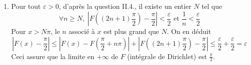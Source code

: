 \begin{enumerate}
\begin{enumerate}
\item Pour tout $\varepsilon >0$, d'après la question II.4., il existe un entier $N$ tel que 
\begin{displaymath}
  \forall n \geq N,\; \left|F((2n+1)\frac{\pi}{2}) - \frac{\pi}{2}\right| < \frac{\varepsilon}{2} \text{ et } \frac{1}{n} < \frac{\varepsilon}{2}
\end{displaymath}
Pour $x> N\pi$, le $n$ associé à $x$ est plus grand que $N$. On en déduit
\begin{displaymath}
\left|F(x) - \frac{\pi}{2}\right| \leq  \left|F(x) - F(\frac{\pi}{2} + n\pi) \right| + \left|F((2n+1)\frac{\pi}{2}) - \frac{\pi}{2}\right|
\leq \frac{\varepsilon}{2} + \frac{\varepsilon}{2} = \varepsilon
\end{displaymath}
Ceci assure que la limite en $+\infty$ de $F$ (intégrale de Dirichlet) est $\frac{\pi}{2}$.
\end{enumerate}
\end{enumerate}


